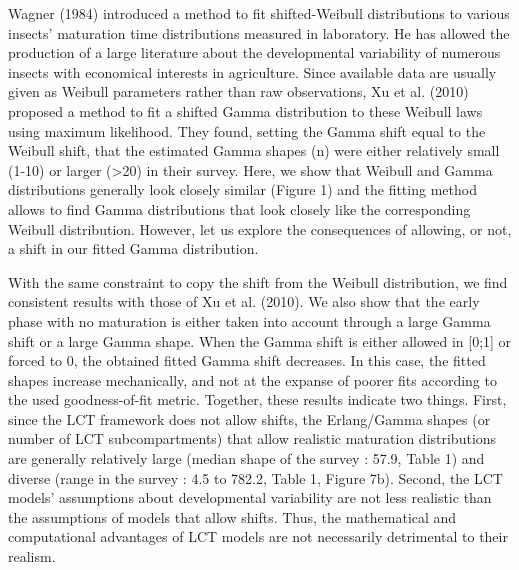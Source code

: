 \documentclass[12pt,a4paper,onecolumn]{article}
\begin{document}
\tabto{1 cm} Wagner (1984) introduced a method to fit shifted-Weibull distributions to various insects' maturation time distributions measured in laboratory. He has allowed the production of a large literature about the developmental variability of numerous insects with economical interests in agriculture.  Since available data are usually given as Weibull parameters rather than raw observations, Xu et al. (2010) proposed a method to fit a shifted Gamma distribution to these Weibull laws using maximum likelihood. They found, setting the Gamma shift equal to the Weibull shift, that the estimated Gamma shapes (n) were either relatively small (1-10) or larger (>20) in their survey. Here, we show that Weibull and Gamma distributions generally look closely similar (Figure 1) and the fitting method allows to find Gamma distributions that look closely like the corresponding Weibull distribution. However, let us explore the consequences of allowing, or not, a shift in our fitted Gamma distribution.

\tabto{1 cm} With the same constraint to copy the shift from the Weibull distribution, we find consistent results with those of Xu et al. (2010). We also show that the early phase with no maturation is either taken into account through a large Gamma shift or a large Gamma shape. When the Gamma shift is either allowed in [0;1] or forced to 0, the obtained fitted Gamma shift decreases. In this case, the fitted shapes increase mechanically, and not at the expanse of poorer fits according to the used goodness-of-fit metric. Together, these results indicate two things. First, since the LCT framework does not allow shifts, the Erlang/Gamma shapes (or number of LCT subcompartments) that allow realistic maturation distributions are generally relatively large (median shape of the survey : 57.9, Table 1) and diverse (range in the survey : 4.5 to 782.2, Table 1, Figure 7b). Second, the LCT models' assumptions about developmental variability are not less realistic than the assumptions of models that allow shifts. Thus, the mathematical and computational advantages of LCT models are not necessarily detrimental to their realism. 
\end{document}
